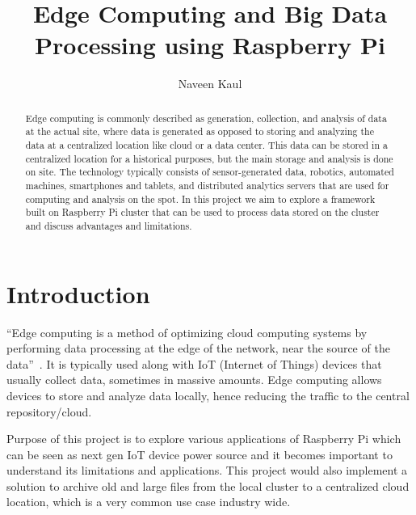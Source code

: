 
\title{Edge Computing and Big Data Processing using Raspberry Pi}


\author{Naveen Kaul}

\renewcommand{\shortauthors}{N. Kaul}


\begin{abstract}
  Edge computing is commonly described as generation, collection, and
  analysis of data at the actual site, where data is generated as
  opposed to storing and analyzing the data at a centralized location
  like cloud or a data center. This data can be stored in a
  centralized location for a historical purposes, but the main storage
  and analysis is done on site. The technology typically consists of
  sensor-generated data, robotics, automated machines, smartphones and
  tablets, and distributed analytics servers that are used for
  computing and analysis on the spot. In this project we aim to
  explore a framework built on Raspberry Pi cluster that can be used
  to process data stored on the cluster and discuss advantages and
  limitations.
\end{abstract}



\maketitle

\section{Introduction}

``Edge computing is a method of optimizing cloud computing systems by
performing data processing at the edge of the network, near the source
of the data''~\cite{hid-sp18-510-edge-wiki}. It is typically used
along with IoT (Internet of Things) devices that usually collect data,
sometimes in massive amounts. Edge computing allows devices to store
and analyze data locally, hence reducing the traffic to the central
repository/cloud.

Purpose of this project is to explore various applications of
Raspberry Pi which can be seen as next gen IoT device power source and
it becomes important to understand its limitations and
applications. This project would also implement a solution to archive
old and large files from the local cluster to a centralized cloud
location, which is a very common use case industry wide.

